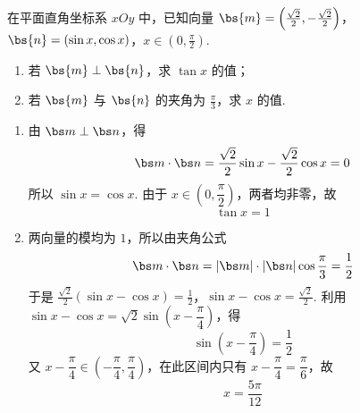 \begin{problem}
在平面直角坐标系 \(xOy\) 中，已知向量 \(\bs{m} = \left(\frac{\sqrt{2}}{2}, -\frac{\sqrt{2}}{2}\right)\)，\(\bs{n} = (\sin x, \cos x)\)，\(x \in \left(0, \frac{\pi}{2}\right)\).

\begin{enumerate}
\item 若 \(\bs{m} \perp \bs{n}\)，求 \(\tan x\) 的值；
\item 若 \(\bs{m}\) 与 \(\bs{n}\) 的夹角为 \(\frac{\pi}{3}\)，求 \(x\) 的值.
\end{enumerate}
\end{problem}

\begin{solution}
\begin{enumerate}
\item 由 \(\bs m\perp\bs n\)，得
\[
\bs m\cdot\bs n
=\frac{\sqrt2}{2}\sin x-\frac{\sqrt2}{2}\cos x=0
\]
所以 \(\sin x=\cos x\). 由于 \(x\in\left(0,\dfrac\pi2\right)\)，两者均非零，故
\[
\tan x=1
\]
\item 两向量的模均为 \(1\)，所以由夹角公式
\[
\bs m\cdot\bs n=|\bs m|\cdot|\bs n|\cos\frac\pi3=\frac12
\]
于是
\(\frac{\sqrt2}{2}\left(\sin x-\cos x\right)=\frac12\)，\(\sin x-\cos x=\frac{\sqrt2}{2}\).
利用 \(\sin x-\cos x=\sqrt2\sin\left(x-\dfrac\pi4\right)\)，得
\[
\sin\left(x-\frac\pi4\right)=\frac12
\]
又 \(x-\dfrac\pi4\in\left(-\dfrac\pi4,\dfrac\pi4\right)\)，在此区间内只有
\(x-\dfrac\pi4=\dfrac\pi6\)，故
\[
x=\frac{5\pi}{12}
\]
\end{enumerate}
\end{solution}

